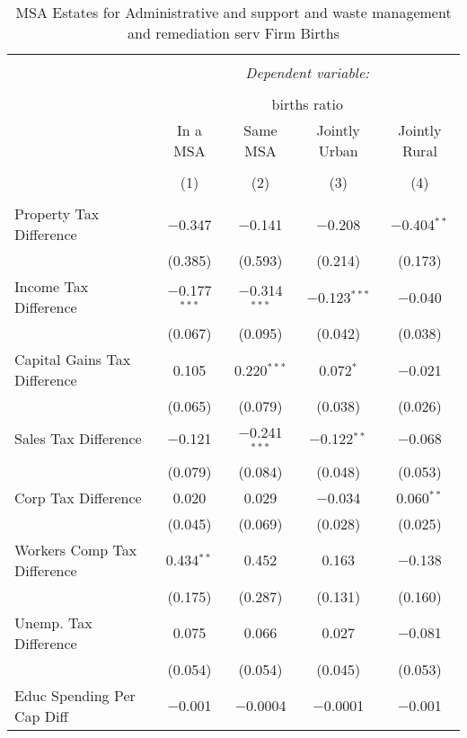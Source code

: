 
\begin{table}[!htbp] \centering 
  \caption{MSA Estates for  Administrative and support and waste management and remediation serv Firm Births} 
  \label{56metro} 
\begin{tabular}{@{\extracolsep{5pt}}lcccc} 
\\[-1.8ex]\hline 
\hline \\[-1.8ex] 
 & \multicolumn{4}{c}{\textit{Dependent variable:}} \\ 
\cline{2-5} 
\\[-1.8ex] & \multicolumn{4}{c}{births ratio} \\ 
 & In a MSA & Same MSA & Jointly Urban & Jointly Rural \\ 
\\[-1.8ex] & (1) & (2) & (3) & (4)\\ 
\hline \\[-1.8ex] 
 Property Tax Difference & $-$0.347 & $-$0.141 & $-$0.208 & $-$0.404$^{**}$ \\ 
  & (0.385) & (0.593) & (0.214) & (0.173) \\ 
  Income Tax Difference & $-$0.177$^{***}$ & $-$0.314$^{***}$ & $-$0.123$^{***}$ & $-$0.040 \\ 
  & (0.067) & (0.095) & (0.042) & (0.038) \\ 
  Capital Gains Tax Difference & 0.105 & 0.220$^{***}$ & 0.072$^{*}$ & $-$0.021 \\ 
  & (0.065) & (0.079) & (0.038) & (0.026) \\ 
  Sales Tax Difference & $-$0.121 & $-$0.241$^{***}$ & $-$0.122$^{**}$ & $-$0.068 \\ 
  & (0.079) & (0.084) & (0.048) & (0.053) \\ 
  Corp Tax Difference & 0.020 & 0.029 & $-$0.034 & 0.060$^{**}$ \\ 
  & (0.045) & (0.069) & (0.028) & (0.025) \\ 
  Workers Comp Tax Difference & 0.434$^{**}$ & 0.452 & 0.163 & $-$0.138 \\ 
  & (0.175) & (0.287) & (0.131) & (0.160) \\ 
  Unemp. Tax Difference & 0.075 & 0.066 & 0.027 & $-$0.081 \\ 
  & (0.054) & (0.054) & (0.045) & (0.053) \\ 
  Educ Spending Per Cap Diff & $-$0.001 & $-$0.0004 & $-$0.0001 & $-$0.001 \\ 

\end{tabular}
\end{table}

